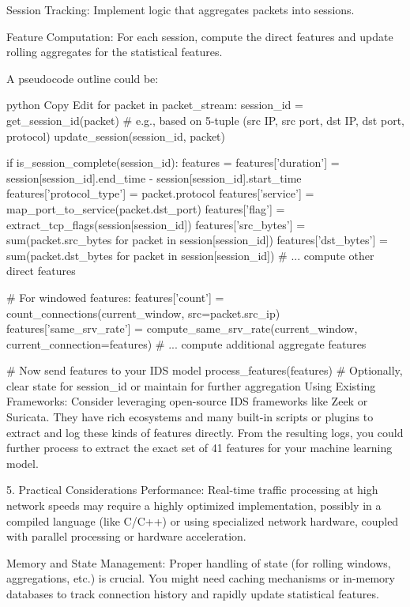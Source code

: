 \documentclass{article}
\begin{document}
Session Tracking: Implement logic that aggregates packets into sessions.

Feature Computation: For each session, compute the direct features and update rolling aggregates for the statistical features.

A pseudocode outline could be:

python
Copy
Edit
for packet in packet_stream:
    session_id = get_session_id(packet)  # e.g., based on 5-tuple (src IP, src port, dst IP, dst port, protocol)
    update_session(session_id, packet)
    
    if is_session_complete(session_id):
        features = {}
        features['duration'] = session[session_id].end_time - session[session_id].start_time
        features['protocol_type'] = packet.protocol
        features['service'] = map_port_to_service(packet.dst_port)
        features['flag'] = extract_tcp_flags(session[session_id])
        features['src_bytes'] = sum(packet.src_bytes for packet in session[session_id])
        features['dst_bytes'] = sum(packet.dst_bytes for packet in session[session_id])
        # ... compute other direct features
        
        # For windowed features:
        features['count'] = count_connections(current_window, src=packet.src_ip)
        features['same_srv_rate'] = compute_same_srv_rate(current_window, current_connection=features)
        # ... compute additional aggregate features
        
        # Now send features to your IDS model
        process_features(features)
        # Optionally, clear state for session_id or maintain for further aggregation
Using Existing Frameworks:
Consider leveraging open-source IDS frameworks like Zeek or Suricata. They have rich ecosystems and many built-in scripts or plugins to extract and log these kinds of features directly. From the resulting logs, you could further process to extract the exact set of 41 features for your machine learning model.

5. Practical Considerations
Performance:
Real-time traffic processing at high network speeds may require a highly optimized implementation, possibly in a compiled language (like C/C++) or using specialized network hardware, coupled with parallel processing or hardware acceleration.

Memory and State Management:
Proper handling of state (for rolling windows, aggregations, etc.) is crucial. You might need caching mechanisms or in-memory databases to track connection history and rapidly update statistical features.
\end{document}
